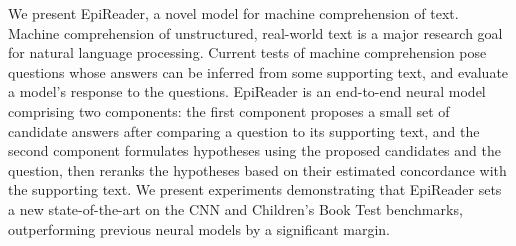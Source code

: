 We present EpiReader, a novel model for machine comprehension of text. Machine comprehension of unstructured, real-world text is a major research goal for natural language processing. Current tests of machine comprehension pose questions whose answers can be inferred from some supporting text, and evaluate a model's response to the questions. EpiReader is an end-to-end neural model comprising two components: the first component proposes a small set of candidate answers after comparing a question to its supporting text, and the second component formulates hypotheses using the proposed candidates and the question, then reranks the hypotheses based on their estimated concordance with the supporting text. We present experiments demonstrating that EpiReader sets a new state-of-the-art on the CNN and Children's Book Test benchmarks, outperforming previous neural models by a significant margin.
